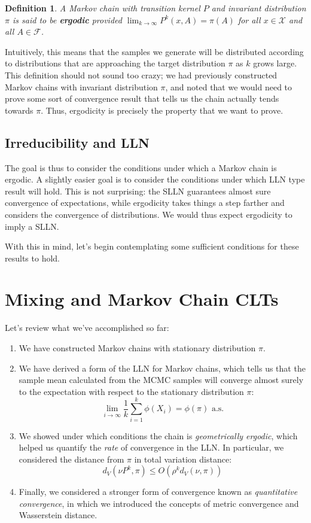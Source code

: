 \documentclass[12pt]{article}
\newtheorem{definition}{Definition}
\begin{document}
\begin{definition}
A Markov chain with transition kernel $P$ and invariant distribution $\pi$ is said to be \textbf{ergodic} provided $\lim_{k \to \infty} P^k(x, A) = \pi(A)$ for all 
$x \in \mathcal{X}$ and all $A \in \mathcal{F}$. 
\end{definition}

Intuitively, this means that the samples we generate will be distributed according to distributions that are approaching the target distribution $\pi$ as $k$ grows large. 
This definition should not sound too crazy; we had previously constructed Markov chains with invariant distribution $\pi$, and noted that we would need to prove some 
sort of convergence result that tells us the chain actually tends towards $\pi$. Thus, ergodicity is precisely the property that we want to prove. 

\subsection{Irreducibility and LLN}
The goal is thus to consider the conditions under which a Markov chain is ergodic. A slightly easier goal is to consider the conditions under which  LLN type result 
will hold. This is not surprising: the SLLN guarantees almost sure convergence of expectations, while ergodicity takes things a step farther and considers the convergence
of distributions. We would thus expect ergodicity to imply a SLLN.  

With this in mind, let's begin contemplating some sufficient conditions for these results to hold. 

\section{Mixing and Markov Chain CLTs}
Let's review what we've accomplished so far: 
\begin{enumerate}
\item We have constructed Markov chains with stationary distribution $\pi$. 
\item We have derived a form of the LLN for Markov chains, which tells us that the sample mean calculated from the MCMC samples will converge almost surely 
to the expectation with respect to the stationary distribution $\pi$: 
\[\lim_{i \to \infty} \frac{1}{k} \sum_{i = 1}^{k} \phi(X_i) = \phi(\pi) \text{ a.s.}\]
\item We showed under which conditions the chain is \textit{geometrically ergodic}, which helped us quantify the \textit{rate} of convergence in the LLN. In particular, 
we considered the distance from $\pi$ in total variation distance: 
\[d_V(\nu P^k, \pi) \leq O(\rho^k d_V(\nu, \pi))\]
\item Finally, we considered a stronger form of convergence known as \textit{quantitative convergence}, in which we introduced the concepts of metric convergence 
and Wasserstein distance.
\end{enumerate}
\end{document}
